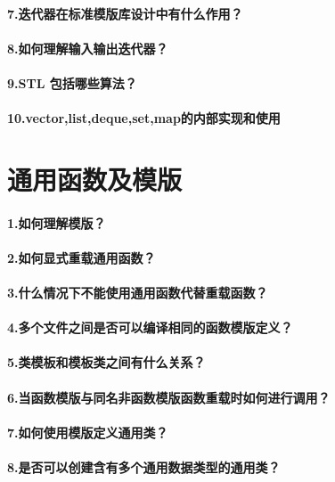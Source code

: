 \documentclass[UTF8,a4paper,8pt]{ctexart}
\begin{document}
	 \paragraph{7.迭代器在标准模版库设计中有什么作用？}
	 \paragraph{8.如何理解输入输出迭代器？}
	 \paragraph{9.STL 包括哪些算法？}
	 \paragraph{10.vector,list,deque,set,map的内部实现和使用}

\section*{通用函数及模版}
  	 \paragraph{1.如何理解模版？} 
  	 \paragraph{2.如何显式重载通用函数？}
  	 \paragraph{3.什么情况下不能使用通用函数代替重载函数？}
  	 \paragraph{4.多个文件之间是否可以编译相同的函数模版定义？}
  	 \paragraph{5.类模板和模板类之间有什么关系？}
  	 \paragraph{6.当函数模版与同名非函数模版函数重载时如何进行调用？}
  	 \paragraph{7.如何使用模版定义通用类？}
  	 \paragraph{8.是否可以创建含有多个通用数据类型的通用类？}
\end{document}
